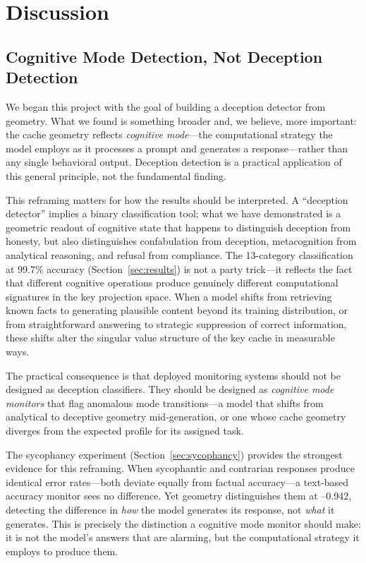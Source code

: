 
\section{Discussion}
\label{sec:discussion}

\subsection{Cognitive Mode Detection, Not Deception Detection}

We began this project with the goal of building a deception detector from \kvcache geometry.
What we found is something broader and, we believe, more important: the cache geometry reflects \emph{cognitive mode}---the computational strategy the model employs as it processes a prompt and generates a response---rather than any single behavioral output.
Deception detection is a practical application of this general principle, not the fundamental finding.

This reframing matters for how the results should be interpreted.
A ``deception detector'' implies a binary classification tool; what we have demonstrated is a geometric readout of cognitive state that happens to distinguish deception from honesty, but also distinguishes confabulation from deception, metacognition from analytical reasoning, and refusal from compliance.
The 13-category classification at 99.7\% accuracy (Section~\ref{sec:results}) is not a party trick---it reflects the fact that different cognitive operations produce genuinely different computational signatures in the key projection space.
When a model shifts from retrieving known facts to generating plausible content beyond its training distribution, or from straightforward answering to strategic suppression of correct information, these shifts alter the singular value structure of the key cache in measurable ways.

The practical consequence is that deployed monitoring systems should not be designed as deception classifiers.
They should be designed as \emph{cognitive mode monitors} that flag anomalous mode transitions---a model that shifts from analytical to deceptive geometry mid-generation, or one whose cache geometry diverges from the expected profile for its assigned task.

The sycophancy experiment (Section~\ref{sec:sycophancy}) provides the strongest evidence for this reframing.
When sycophantic and contrarian responses produce identical error rates---both deviate equally from factual accuracy---a text-based accuracy monitor sees no difference.
Yet \kvcache geometry distinguishes them at --0.942, detecting the difference in \emph{how} the model generates its response, not \emph{what} it generates.
This is precisely the distinction a cognitive mode monitor should make: it is not the model's answers that are alarming, but the computational strategy it employs to produce them.

